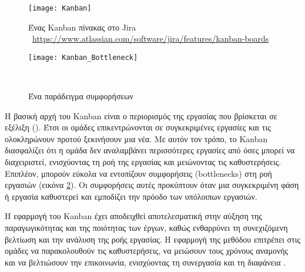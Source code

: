             \begin{figure}[h!] \noindent \centering
                \texttt{[image: Kanban]}
                \caption{\centering Ένας Kanban πίνακας στο Jira \\ {\footnotesize \textcopyright\ \url{https://www.atlassian.com/software/jira/features/kanban-boards}}}
                \label{fig:Kanban}
            \end{figure}

            \begin{figure}[h!] \noindent \centering
                \texttt{[image: Kanban\_Bottleneck]}
                \caption{Ένα παράδειγμα συμφορήσεων \cite{Agile_Stellman}}\
                \label{fig:Kanban_Bottleneck}
            \end{figure}

            Η βασική αρχή του Kanban είναι ο περιορισμός της εργασίας που βρίσκεται σε εξέλιξη (). Έτσι οι ομάδες επικεντρώνονται σε συγκεκριμένες εργασίες και τις ολοκληρώνουν προτού ξεκινήσουν μια νέα. Με αυτόν τον τρόπο, το Kanban διασφαλίζει ότι η ομάδα δεν αναλαμβάνει περισσότερες εργασίες από όσες μπορεί να διαχειριστεί, ενισχύοντας τη ροή της εργασίας και μειώνοντας τις καθυστερήσεις. Επιπλέον, μπορούν εύκολα να εντοπίζουν συμφορήσεις (bottlenecks) στη ροή εργασιών (εικόνα \ref{fig:Kanban_Bottleneck}). Οι συμφορήσεις αυτές προκύπτουν όταν μια συγκεκριμένη φάση ή εργασία καθυστερεί και εμποδίζει την πρόοδο των υπόλοιπων εργασιών.

            Η εφαρμογή του Kanban έχει αποδειχθεί αποτελεσματική στην αύξηση της παραγωγικότητας και της ποιότητας των έργων, καθώς ενθαρρύνει τη συνεχιζόμενη βελτίωση και την ανάλυση της ροής εργασίας. Η εφαρμογή της μεθόδου επιτρέπει στις ομάδες να παρακολουθούν τις καθυστερήσεις, να μειώσουν τους χρόνους αναμονής και να βελτιώσουν την επικοινωνία, ενισχύοντας τη συνεργασία και τη διαφάνεια \cite{Agile_Stellman, AndersonKanban}.
